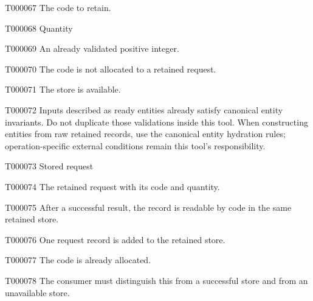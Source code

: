 \documentclass[11pt,a4paper]{article}
\begin{document}
\begin{atlasparagraph}{T000067}
The code to retain.
\end{atlasparagraph}
\begin{atlastext}{T000068}
Quantity
\end{atlastext}
\begin{atlasparagraph}{T000069}
An already validated positive integer.
\end{atlasparagraph}
\begin{atlasparagraph}{T000070}
The code is not allocated to a retained request.
\end{atlasparagraph}
\begin{atlasparagraph}{T000071}
The store is available.
\end{atlasparagraph}
\begin{atlasparagraph}{T000072}
Inputs described as ready entities already satisfy canonical entity invariants. Do not duplicate those validations inside this tool. When constructing entities from raw retained records, use the canonical entity hydration rules; operation-specific external conditions remain this tool's responsibility.
\end{atlasparagraph}
\begin{atlastext}{T000073}
Stored request
\end{atlastext}
\begin{atlasparagraph}{T000074}
The retained request with its code and quantity.
\end{atlasparagraph}
\begin{atlasparagraph}{T000075}
After a successful result, the record is readable by code in the same retained store.
\end{atlasparagraph}
\begin{atlasparagraph}{T000076}
One request record is added to the retained store.
\end{atlasparagraph}
\begin{atlasparagraph}{T000077}
The code is already allocated.
\end{atlasparagraph}
\begin{atlasparagraph}{T000078}
The consumer must distinguish this from a successful store and from an unavailable store.
\end{atlasparagraph}
\end{document}
